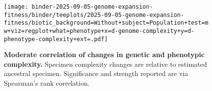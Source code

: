 \begin{figure}
\centering
\texttt{[image: binder-2025-09-05-genome-expansion-fitness/binder/teeplots/2025-09-05-genome-expansion-fitness/biotic\_background=Without+subject=Population+test=mw+viz=regplot+what=phenotype+x=d-genome-complexity+y=d-phenotype-complexity+ext=.pdf]}
\caption{%
\textbf{Moderate correlation of changes in genetic and phenotypic complexity.}
\footnotesize
Specimen complexity changes are relative to estimated ancestral specimen.
Significance and strength reported are via Spearman's rank correlation.
}
\label{fig:gpcomplex-correlation}
\end{figure}
